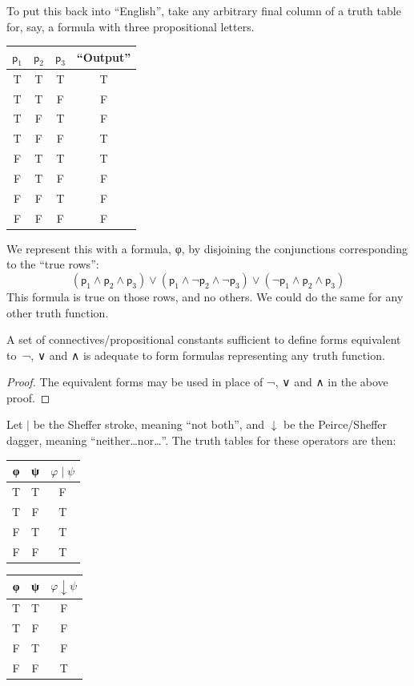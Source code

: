 \documentclass[12pt]{report}
\theoremstyle{nonumberplain}
\newtheorem{proof}{Proof}
\begin{document}
\noindent To put this back into ``English'', take any arbitrary final column of a truth table for, say, a formula with three propositional letters.
\begin{center}
\noindent\begin{tabular}{@{}cccc@{}}
$\mathsf{p}_1$ & $\mathsf{p}_2$ & $\mathsf{p}_3$ & ``Output'' \\ \hline
T & T & T & T\\
T & T & F & F\\
T & F & T & F\\
T & F & F & T\\
F & T & T & T\\
F & T & F & F\\
F & F & T & F\\
F & F & F & F
\end{tabular}
\end{center}
\noindent We represent this with a formula, φ, by disjoining the conjunctions corresponding to the ``true rows'':
\[
(\mathsf{p}_1 ∧ \mathsf{p}_2 ∧ \mathsf{p}_3) ∨ (\mathsf{p}_1 ∧ ¬\mathsf{p}_2 ∧ ¬ \mathsf{p}_3) ∨ (¬\mathsf{p}_1 ∧ \mathsf{p}_2 ∧ \mathsf{p}_3)
\]
\noindent This formula is true on those rows, and no others. We could do the same for any other truth function.
\begin{coro}
A set of connectives/propositional constants sufficient to define forms equivalent to \,¬, ∨ and ∧ is adequate to form formulas representing any truth function.
\end{coro}
\begin{proof} The equivalent forms may be used in place of ¬, ∨ and ∧ in the above proof.
\end{proof}
Let $|$ be the Sheffer stroke, meaning ``not both'', and $\downarrow$ be the Peirce/Sheffer dagger, meaning ``neither\ldots nor\ldots''. The truth tables for these operators are then:

\begin{center}
\begin{tabular}{@{}ccc}
φ & ψ & $φ \mathrel{|} ψ$\\ \hline
T & T & F\\
T & F & T\\
F & T & T\\
F & F & T
\end{tabular} \qquad\qquad
\begin{tabular}{@{}ccc}
φ & ψ & $φ \downarrow ψ$\\ \hline
T & T & F\\
T & F & F\\
F & T & F\\
F & F & T
\end{tabular}
\end{center}
\end{document}
